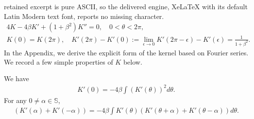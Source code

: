 \documentclass[10pt,a4paper]{amsart}
\newcommand{\alp}{\alpha}
\newcommand{\bbS}{\mathbb S}
\newcommand{\bt}{\beta}
\newcommand{\tht}{\theta}
\begin{document}
retained excerpt is pure ASCII, so the delivered engine, XeLaTeX with its default Latin Modern text font, reports no missing character.
	\begin{equation}\label{eq:K}
 \begin{split}
			4K - 4\bt K' + (1+\bt^2)K'' = 0, \quad 0<\tht<2\pi, \\
			K(0) = K(2\pi), \quad K'(2\pi)-K'(0) := \lim_{\epsilon\to 0}K'(2\pi-\epsilon)-K'(\epsilon)=\frac{1}{1+\beta^2}. 
    \end{split}
	\end{equation} In the Appendix, we derive the explicit form of the kernel based on Fourier series. We record a few simple properties of $K$ below. 

	\begin{lemma} We have 
		\begin{equation}\label{eq:Kp0}
			\begin{split}
				K'(0) = - 4\bt \int (K'(\tht))^2 d\tht. 
			\end{split}
		\end{equation} For any $0 \ne \alp \in \bbS$, \begin{equation}\label{eq:Kpa}
			\begin{split}
				\left( K'(\alp) + K'(-\alp) \right)= -4\bt \int K'(\tht) \left( K'(\tht+\alp) + K'(\tht-\alp) \right) d\tht. 
			\end{split}
		\end{equation}
	\end{lemma}
\end{document}
